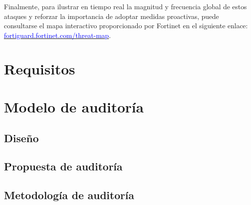 \documentclass[a4paper, 10pt]{article}
\begin{document}
    Finalmente, para ilustrar en tiempo real la magnitud y frecuencia global de estos ataques y reforzar la importancia de adoptar medidas proactivas, puede consultarse el mapa interactivo proporcionado por Fortinet en el siguiente enlace: \href{https://fortiguard.fortinet.com/threat-map}{\textcolor{blue}{fortiguard.fortinet.com/threat-map}}.
    
    \clearpage
    
    
    



























\section{Requisitos}

\clearpage

\section{Modelo de auditoría}

\subsection{Diseño}

\subsection{Propuesta de auditoría}

\subsection{Metodología de auditoría}

\clearpage


\end{document}
